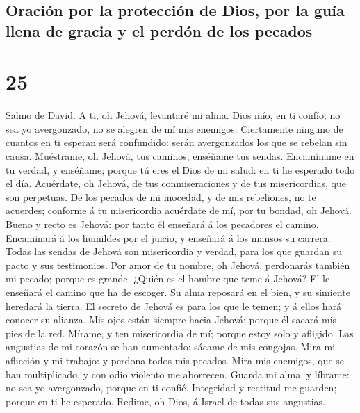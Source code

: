 \hypertarget{oraciuxf3n-por-la-protecciuxf3n-de-dios-por-la-guuxeda-llena-de-gracia-y-el-perduxf3n-de-los-pecados}{%
\subsection{Oración por la protección de Dios, por la guía llena de
gracia y el perdón de los
pecados}\label{oraciuxf3n-por-la-protecciuxf3n-de-dios-por-la-guuxeda-llena-de-gracia-y-el-perduxf3n-de-los-pecados}}

\hypertarget{section-24}{%
\section{25}\label{section-24}}

 Salmo de David. A ti, oh Jehová, levantaré mi alma.
 Dios mío, en ti confío; no sea yo avergonzado, no se
alegren de mí mis enemigos.  Ciertamente ninguno de
cuantos en ti esperan será confundido: serán avergonzados los que se
rebelan sin causa.  Muéstrame, oh Jehová, tus caminos;
enséñame tus sendas.  Encamíname en tu verdad, y enséñame;
porque tú eres el Dios de mi salud: en ti he esperado todo el día.
 Acuérdate, oh Jehová, de tus conmiseraciones y de tus
misericordias, que son perpetuas.  De los pecados de mi
mocedad, y de mis rebeliones, no te acuerdes; conforme á tu misericordia
acuérdate de mí, por tu bondad, oh Jehová.  Bueno y recto
es Jehová: por tanto él enseñará á los pecadores el camino.
 Encaminará á los humildes por el juicio, y enseñará á los
mansos su carrera.  Todas las sendas de Jehová son
misericordia y verdad, para los que guardan su pacto y sus testimonios.
 Por amor de tu nombre, oh Jehová, perdonarás también mi
pecado; porque es grande.  ¿Quién es el hombre que teme á
Jehová? El le enseñará el camino que ha de escoger.  Su
alma reposará en el bien, y su simiente heredará la tierra.
 El secreto de Jehová es para los que le temen; y á ellos
hará conocer su alianza.  Mis ojos están siempre hacia
Jehová; porque él sacará mis pies de la red.  Mírame, y
ten misericordia de mí; porque estoy solo y afligido. 
Las angustias de mi corazón se han aumentado: sácame de mis congojas.
 Mira mi aflicción y mi trabajo: y perdona todos mis
pecados.  Mira mis enemigos, que se han multiplicado, y
con odio violento me aborrecen.  Guarda mi alma, y
líbrame: no sea yo avergonzado, porque en ti confié. 
Integridad y rectitud me guarden; porque en ti he esperado.
 Redime, oh Dios, á Israel de todas sus angustias.

